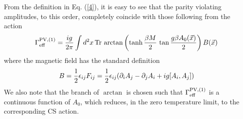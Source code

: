 \documentclass[a4paper,12pt]{article}
\begin{document}
From the definition in Eq. (\ref{4}), it is easy to see that the
parity violating amplitudes, to this order, completely
coincide with those following from the action
\begin{equation}
\Gamma_{\rm eff}^{{\rm PV}, (1)} = {ig\over 2\pi} \int d^{2}x\,{\rm
  Tr}\,\arctan\left(\tanh {\beta M\over 2}\,\tan {g\beta A_{0}(\vec{x})\over
  2}\right) B(\vec{x})\label{8}
\end{equation}
where the magnetic field has the standard definition
\begin{equation}
B = {1\over 2} \epsilon_{ij}F_{ij} = {1\over 2} \epsilon_{ij}
(\partial_{i}A_{j}-\partial_{j}A_{i} + ig[A_{i},A_{j}])\label{9}
\end{equation}
We also note that the branch of $\arctan$ is chosen such that
$\Gamma_{\rm eff}^{{\rm PV}, (1)}$ is a continuous function
of $A_{0}$, which reduces, in the zero temperature limit, to
the corresponding CS action.
\end{document}
